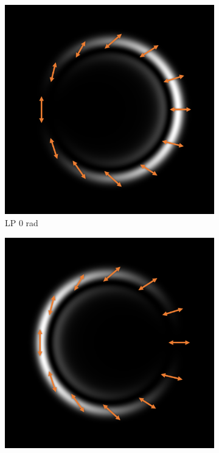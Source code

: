 \documentclass[11pt, a4paper, twoside]{article} %
\begin{document}
\begin{figure}[h!]
\begin{subfigure}[b]{0.245\linewidth}
     \includegraphics[width=\linewidth]{simul23.PNG}
    \caption{LP 0 rad}
     \end{subfigure}
 \begin{subfigure}[b]{0.245\linewidth}
     \includegraphics[width=\linewidth]{simul22.PNG}

\end{subfigure}
\end{figure}
\end{document}
